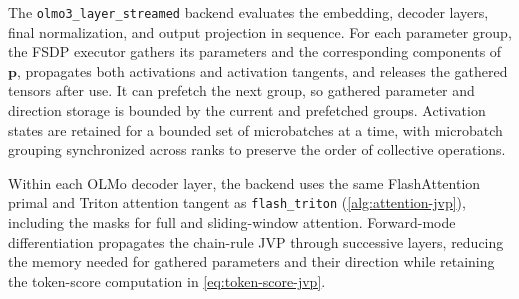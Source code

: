 \documentclass{article} %
\begin{document}
The \texttt{olmo3\_layer\_streamed} backend evaluates the embedding, decoder
layers, final normalization, and output projection in sequence. For each
parameter group, the FSDP executor gathers its parameters and the corresponding
components of \(\boldsymbol p\), propagates both activations and activation
tangents, and releases the gathered tensors after use. It can prefetch the
next group, so gathered parameter and direction storage is bounded by the
current and prefetched groups. Activation states are retained for a bounded
set of microbatches at a time, with microbatch grouping synchronized across
ranks to preserve the order of collective operations.

Within each OLMo decoder layer, the backend uses the same FlashAttention
primal and Triton attention tangent as \texttt{flash\_triton}
(\cref{alg:attention-jvp}), including the masks for full and sliding-window
attention. Forward-mode differentiation propagates the chain-rule JVP through
successive layers, reducing the memory needed for gathered parameters and
their direction while retaining the token-score computation in
\cref{eq:token-score-jvp}.
\end{document}
